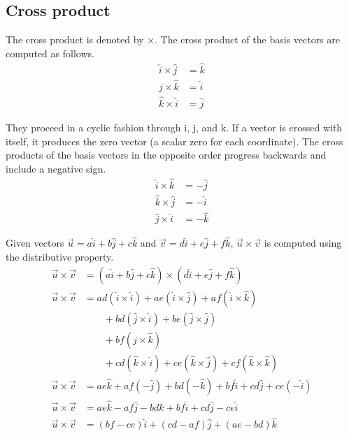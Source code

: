 \subsection{Cross product}

The cross product is denoted by $\times$. The cross product of the basis vectors
are computed as follows.
\begin{align*}
  \hat{i} \times \hat{j} &= \hat{k} \\
  \hat{j} \times \hat{k} &= \hat{i} \\
  \hat{k} \times \hat{i} &= \hat{j}
\end{align*}

They proceed in a cyclic fashion through i, j, and k. If a vector is crossed
with itself, it produces the zero vector (a scalar zero for each coordinate).
The cross products of the basis vectors in the opposite order progress backwards
and include a negative sign.
\begin{align*}
  \hat{i} \times \hat{k} &= -\hat{j} \\
  \hat{k} \times \hat{j} &= -\hat{i} \\
  \hat{j} \times \hat{i} &= -\hat{k}
\end{align*}

Given vectors
$\vec{u} = a\hat{i} + b\hat{j} + c\hat{k}$ and
$\vec{v} = d\hat{i} + e\hat{j} + f\hat{k}$, $\vec{u} \times \vec{v}$ is computed
using the distributive property.
\begin{align*}
  \vec{u} \times \vec{v} &= (a\hat{i} + b\hat{j} + c\hat{k}) \times
    (d\hat{i} + e\hat{j} + f\hat{k}) \\
  \vec{u} \times \vec{v} &= ad(\hat{i} \times \hat{i}) + ae(\hat{i} \times
    \hat{j}) + af(\hat{i} \times \hat{k}) \\
      &\qquad + bd(\hat{j} \times \hat{i}) + be(\hat{j} \times \hat{j}) \\
      &\qquad + bf(\hat{j} \times \hat{k}) \\
      &\qquad + cd(\hat{k} \times \hat{i}) + ce(\hat{k} \times \hat{j}) +
    cf(\hat{k} \times \hat{k}) \\
  \vec{u} \times \vec{v} &= ae\hat{k} + af(-\hat{j}) + bd(-\hat{k}) +
    bf\hat{i} + cd\hat{j} + ce(-\hat{i}) \\
  \vec{u} \times \vec{v} &= ae\hat{k} - af\hat{j} - bd\hat{k} + bf\hat{i} +
    cd\hat{j} - ce\hat{i} \\
  \vec{u} \times \vec{v} &= (bf - ce)\hat{i} + (cd - af)\hat{j} +
    (ae - bd)\hat{k}
\end{align*}
